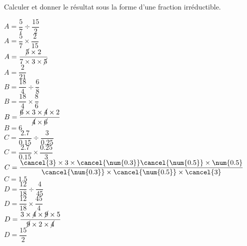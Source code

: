 \begin{corrige}
    Calculer et donner le résultat sous la forme d'une fraction irréductible.
    \begin{multicols}{2}
        \begin{spacing}{2}
            \begin{itemize}
                \def\item{}
                \item $A=\dfrac{5}{7}\div\dfrac{15}{2}$\\
                {\red $A=\dfrac{5}{7}\times\dfrac{2}{15}$\\$A=\dfrac{\cancel{5}\times 2}{7\times 3\times\cancel{5}}$\\$A=\dfrac{2}{21}$}\\
                \item $B=\dfrac{18}{4}\div\dfrac{6}{8}$\\
                {\red $B=\dfrac{18}{4}\times\dfrac{8}{6}$\\$B=\dfrac{\cancel{6}\times 3\times\cancel{4}\times 2}{\cancel{4}\times\cancel{6}}$\\$B=6$}\\
                \item $C=\dfrac{\num{2.7}}{\num{0.15}}\div\dfrac{3}{\num{0.25}}$\\
                {\red $C=\dfrac{\num{2.7}}{\num{0.15}}\times\dfrac{\num{0.25}}{3}$\\$C=\dfrac{\cancel{3}\times 3\times\cancel{\num{0.3}}\cancel{\num{0.5}}\times\num{0.5}}{\cancel{\num{0.3}}\times\cancel{\num{0.5}}\times\cancel{3}}$\\$C=\num{1.5}$}\\
                \item $D=\dfrac{12}{18}\div\dfrac{4}{45}$\\
                {\red $D=\dfrac{12}{18}\times\dfrac{45}{4}$\\$D=\dfrac{3\times\cancel{4}\times\cancel{9}\times 5}{\cancel{9}\times 2\times\cancel{4}}$\\$D=\dfrac{15}{2}$}
            \end{itemize}
        \end{spacing}
    \end{multicols}
\end{corrige}

